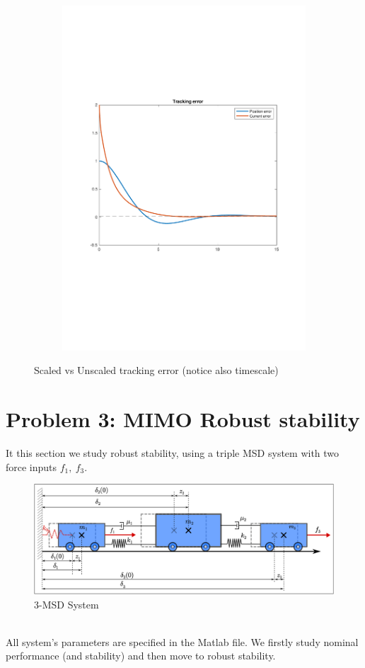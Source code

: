 \documentclass[a4paper, 12pt]{article}
\begin{document}
\begin{figure}[h!]{}
\begin{subfigure}[t]{0.45\textwidth}
    \includegraphics[width=\textwidth]{Figures/unscaled.pdf}
           \label{fig:unscaled}
    \end{subfigure}
    \caption*{Scaled vs Unscaled tracking error (notice also timescale)}
    \label{fig:unscaled}
   \end{figure}
\clearpage
\section{Problem 3: MIMO Robust stability}
It this section we study robust stability, using a triple MSD system with two force inputs $f_1,\ f_3$.
\begin{figure}[h!]
\includegraphics[width=\textwidth]{Figures/3MSD.pdf}
    \caption*{3-MSD System}
\end{figure}\\
All system's parameters are specified in the Matlab file. 
We firstly study nominal performance (and stability) and then move to robust stability.
\end{document}

